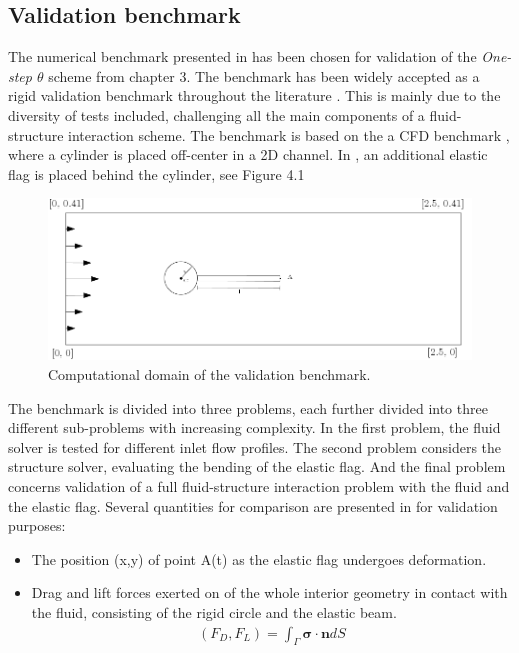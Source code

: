 \subsection{Validation benchmark}
The numerical benchmark presented in \cite{Hron2006} has been chosen for validation of the \textit{One-step $\theta$} scheme from chapter 3. The benchmark has been widely accepted as a rigid validation benchmark  throughout the literature \cite{Wickb, Wick,  Gatzhammer2014}. This is mainly due to the diversity of tests included, challenging all the main components of a fluid-structure interaction scheme. The benchmark is based on the a CFD benchmark \cite{White}, where a cylinder is placed off-center in a 2D channel. In \cite{Hron2006}, an additional elastic flag is placed behind the cylinder, see Figure 4.1
\begin{figure}[h!]
  \centering
    \includegraphics[scale=0.2]{./Fig/turekflag.png}
      \caption{Computational domain of the validation benchmark.}
      \label{fig:tflag}
\end{figure}
The benchmark is divided into three problems, each further divided into three different sub-problems with increasing complexity. In the first problem, the fluid solver is tested for different inlet flow profiles. The second problem considers the structure solver, evaluating the bending of the elastic flag. And the final problem concerns validation of a full fluid-structure interaction problem with the fluid and the elastic flag.  Several quantities for comparison are presented in \cite{Hron2006} for validation purposes:
\begin{itemize}
\item The position (x,y) of point A(t) as the elastic flag undergoes deformation.
\item Drag and lift forces exerted on of the whole interior geometry in contact with the fluid, consisting of the rigid circle and the elastic beam.
\begin{align*}
(F_D, F_L) = \int_{\Gamma} \mathbf{\sigma} \cdot \mathbf{n} dS
\end{align*}
\end{itemize}
